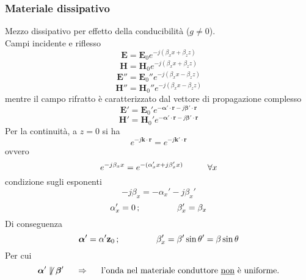\documentclass[a4paper]{article}
\begin{document}
\subsubsection*{Materiale dissipativo}
Mezzo dissipativo per effetto della conducibilità ($g\neq0$).\\
Campi incidente e riflesso
\begin{equation*}
\textbf{E}=\textbf{E}_0e^{-j(\beta_xx+\beta_zz)}
\end{equation*}
\begin{equation*}
\textbf{H}=\textbf{H}_0e^{-j(\beta_xx+\beta_zz)}
\end{equation*}
\begin{equation*}
\textbf{E}''=\textbf{E}_0''e^{-j(\beta_xx-\beta_zz)}
\end{equation*}
\begin{equation*}
\textbf{H}''=\textbf{H}_0''e^{-j(\beta_xx-\beta_zz)}
\end{equation*}
mentre il campo rifratto è caratterizzato dal vettore di propagazione complesso
\begin{equation*}
\textbf{E}'=\textbf{E}_0'e^{-\bm{\alpha}'\cdot\textbf{r}-j\bm{\beta}'\cdot\textbf{r}}
\end{equation*}
\begin{equation*}
\textbf{H}'=\textbf{H}_0'e^{-\bm{\alpha}'\cdot\textbf{r}-j\bm{\beta}'\cdot\textbf{r}}
\end{equation*}
Per la continuità, a $z=0$ si ha
\begin{equation*}
e^{-j\textbf{k}\cdot\textbf{r}}=e^{-j\textbf{k}'\cdot\textbf{r}}
\end{equation*}
ovvero
\begin{equation*}
e^{-j\beta_xx}=e^{-(\alpha_x'x+j\beta_x'x)}\hspace{10mm}\forall x
\end{equation*}
condizione sugli esponenti
\begin{equation*}
-j\beta_x=-\alpha_x'-j\beta_x'
\end{equation*}
\begin{equation*}
\alpha_x'=0\,;\hspace{15mm}\beta_x'=\beta_x
\end{equation*}
Di conseguenza
\begin{equation*}
\bm{\alpha}'=\alpha'\textbf{z}_0\,;\hspace{15mm}\beta_x'=\beta'\sin\theta'=\beta\sin\theta
\end{equation*}
Per cui
\begin{equation*}
\bm{\alpha}'\not\parallel\bm{\beta}'\hspace{5mm}\Rightarrow\hspace{5mm}\text{l'onda nel materiale conduttore \underline{non} è uniforme.}
\end{equation*}
\end{document}

